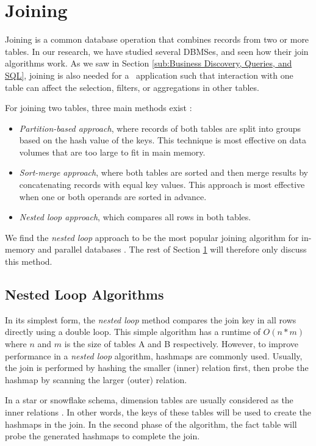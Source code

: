 \section{Joining}
\label{sec:Joining}
Joining is a common database operation that combines records from two or more tables. In our research, we have studied several DBMSes, and seen how their join algorithms work. As we saw in Section \ref{sub:Business Discovery, Queries, and SQL}, joining is also needed for a \bd~application such that interaction with one table can affect the selection, filters, or aggregations in other tables.

For joining two tables, three main methods exist \cite{Bratbergsengen2015-ed}: 
\begin{itemize}
  \item \textit{Partition-based approach}, where records of both tables are split into groups based on the hash value of the keys. This technique is most effective on data volumes that are too large to fit in main memory.
  \item \textit{Sort-merge approach}, where both tables are sorted and then merge results by concatenating records with equal key values. This approach is most effective when one or both operands are sorted in advance.
  \item \textit{Nested loop approach}, which compares all rows in both tables.
\end{itemize}

We find the \textit{nested loop} approach to be the most popular joining algorithm for in-memory and parallel databases \cite{Boncz2002-yj}. The rest of Section \ref{sec:Joining} will therefore only discuss this method.

\subsection{Nested Loop Algorithms}
\label{sub:Nested Loop Algorithms}

In its simplest form, the \textit{nested loop} method compares the join key in all rows directly using a double loop. This simple algorithm has a runtime of $O(n*m)$ where $n$ and $m$ is the size of tables A and B respectively. However, to improve performance in a \textit{nested loop} algorithm, hashmaps are commonly used. Usually, the join is performed by hashing the smaller (inner) relation first, then probe the hashmap by scanning the larger (outer) relation. 

In a star or snowflake schema, dimension tables are usually considered as the inner relations \cite{Barber2012-xt, Raman2013-em}. In other words, the keys of these tables will be used to create the hashmaps in the join. In the second phase of the algorithm, the fact table will probe the generated hashmaps to complete the join. 

